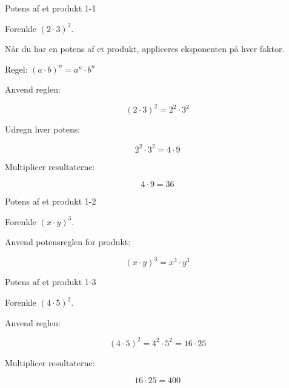 \documentclass{article}
\begin{document}

\tableofcontents
\newpage

\begin{exercise}{Potens af et produkt 1-1}

Forenkle $(2 \cdot 3)^2$.


\hint

Når du har en potens af et produkt, appliceres eksponenten på hver faktor.

\hint

Regel: $(a \cdot b)^n = a^n \cdot b^n$

\hint

Anvend reglen:

\hint
\[
(2 \cdot 3)^2 = 2^2 \cdot 3^2
\]

\hint

Udregn hver potens:

\hint
\[
2^2 \cdot 3^2 = 4 \cdot 9
\]

\hint

Multiplicer resultaterne:

\hint
\[
4 \cdot 9 = 36
\]

\end{exercise}

\newpage

\begin{exercise}{Potens af et produkt 1-2}

Forenkle $(x \cdot y)^3$.


\hint

Anvend potensreglen for produkt:

\hint
\[
(x \cdot y)^3 = x^3 \cdot y^3
\]

\end{exercise}

\newpage

\begin{exercise}{Potens af et produkt 1-3}

Forenkle $(4 \cdot 5)^2$.


\hint

Anvend reglen:

\hint
\[
(4 \cdot 5)^2 = 4^2 \cdot 5^2 = 16 \cdot 25
\]

\hint

Multiplicer resultaterne:

\hint
\[
16 \cdot 25 = 400
\]

\end{exercise}
\end{document}
